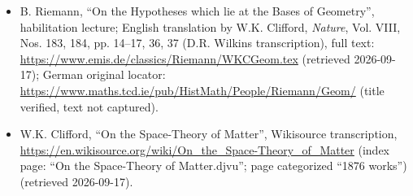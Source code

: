 \documentclass[11pt,a4paper]{article}
\begin{document}
\begin{itemize}[leftmargin=1.6em,itemsep=2pt,parsep=0pt,topsep=3pt]
\item[R53.] B. Riemann, ``On the Hypotheses which lie at the Bases of Geometry'', habilitation lecture; English translation by W.K. Clifford, \textit{Nature}, Vol. VIII, Nos. 183, 184, pp. 14–17, 36, 37 (D.R. Wilkins transcription), full text: \url{https://www.emis.de/classics/Riemann/WKCGeom.tex} (retrieved 2026-09-17); German original locator: \url{https://www.maths.tcd.ie/pub/HistMath/People/Riemann/Geom/} (title verified, text not captured).
\item[R54.] W.K. Clifford, ``On the Space-Theory of Matter'', Wikisource transcription, \url{https://en.wikisource.org/wiki/On_the_Space-Theory_of_Matter} (index page: ``On the Space-Theory of Matter.djvu''; page categorized ``1876 works'') (retrieved 2026-09-17).
\end{itemize}
\end{document}
